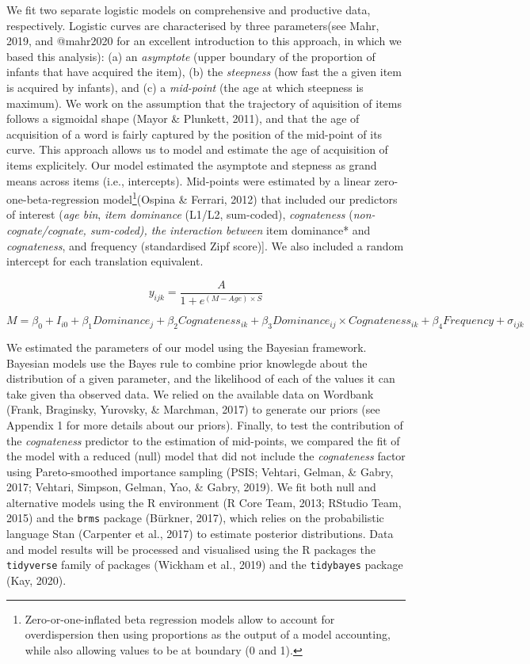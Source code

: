 \documentclass[english,man,man,floatsintext]{apa6}
\begin{document}
We fit two separate logistic models on comprehensive and productive data, respectively. Logistic curves are characterised by three parameters(see Mahr, 2019, and @mahr2020 for an excellent introduction to this approach, in which we based this analysis): (a) an \emph{asymptote} (upper boundary of the proportion of infants that have acquired the item), (b) the \emph{steepness} (how fast the a given item is acquired by infants), and (c) a \emph{mid-point} (the age at which steepness is maximum). We work on the assumption that the trajectory of aquisition of items follows a sigmoidal shape (Mayor \& Plunkett, 2011), and that the age of acquisition of a word is fairly captured by the position of the mid-point of its curve. This approach allows us to model and estimate the age of acquisition of items explicitely. Our model estimated the asymptote and stepness as grand means across items (i.e., intercepts). Mid-points were estimated by a linear zero-one-beta-regression model\footnote{Zero-or-one-inflated beta regression models allow to account for overdispersion then using proportions as the output of a model accounting, while also allowing values to be at boundary (0 and 1).}(Ospina \& Ferrari, 2012) that included our predictors of interest (\emph{age bin}, \emph{item dominance} (L1/L2, sum-coded), \emph{cognateness} (\emph{non-cognate/cognate, sum-coded), the interaction between }item dominance* and \emph{cognateness}, and frequency (standardised Zipf score){]}. We also included a random intercept for each translation equivalent.

\[y_{ijk} = \frac{A}{1 + e^{(M-Age) \times S}}\]

\[M = \beta_{0} + I_{i0} + \beta_{1} Dominance_{j} + \beta_{2} Cognateness_{ik} + \beta_{3} Dominance_{ij} \times Cognateness_{ik} + \beta_{4} Frequency + \sigma_{ijk}\]

We estimated the parameters of our model using the Bayesian framework. Bayesian models use the Bayes rule to combine prior knowlegde about the distribution of a given parameter, and the likelihood of each of the values it can take given tha observed data. We relied on the available data on Wordbank (Frank, Braginsky, Yurovsky, \& Marchman, 2017) to generate our priors (see Appendix 1 for more details about our priors). Finally, to test the contribution of the \emph{cognateness} predictor to the estimation of mid-points, we compared the fit of the model with a reduced (null) model that did not include the \emph{cognateness} factor using Pareto-smoothed importance sampling (PSIS; Vehtari, Gelman, \& Gabry, 2017; Vehtari, Simpson, Gelman, Yao, \& Gabry, 2019). We fit both null and alternative models using the R environment (R Core Team, 2013; RStudio Team, 2015) and the \texttt{brms} package (Bürkner, 2017), which relies on the probabilistic language Stan (Carpenter et al., 2017) to estimate posterior distributions. Data and model results will be processed and visualised using the R packages the \texttt{tidyverse} family of packages (Wickham et al., 2019) and the \texttt{tidybayes} package (Kay, 2020).
\end{document}
